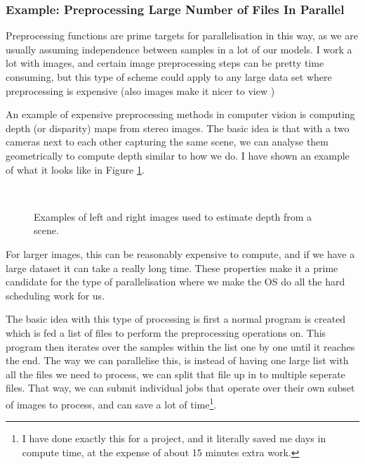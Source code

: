 \subsubsection{Example: Preprocessing Large Number of Files In Parallel}
%
%
Preprocessing functions are prime targets for parallelisation in this way, as we are usually assuming independence between samples in a lot of our models. I work a lot with images, and certain image preprocessing steps can be pretty time consuming, but this type of scheme could apply to any large data set where preprocessing is expensive (also images make it nicer to view \smiley)
%
%
\par
%
%
An example of expensive preprocessing methods in computer vision is computing depth (or disparity) maps from stereo images. The basic idea is that with a two cameras next to each other capturing the same scene, we can analyse them geometrically to compute depth similar to how we do. I have shown an example of what it looks like in Figure \ref{fig:disp}.
%
%
\begin{figure}[!h]
  \centering
  \\
  \caption{Examples of left and right images used to estimate depth from a scene.}
  \label{fig:disp}
\end{figure}
%
%
\par
%
%
For larger images, this can be reasonably expensive to compute, and if we have a large dataset it can take a really long time. These properties make it a prime candidate for the type of parallelisation where we make the OS do all the hard scheduling work for us.
%
%
\par
%
%
The basic idea with this type of processing is first a normal program is created which is fed a list of files to perform the preprocessing operations on. This program then iterates over the samples within the list one by one until it reaches the end. The way we can parallelise this, is instead of having one large list with all the files we need to process, we can split that file up in to multiple seperate files. That way, we can submit individual jobs that operate over their own subset of images to process, and can save a lot of time\footnote{I have done exactly this for a project, and it literally saved me days in compute time, at the expense of about 15 minutes extra work.}.
%
%
\par
